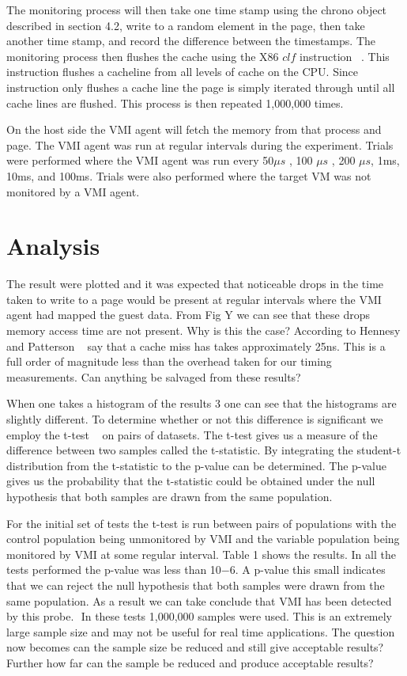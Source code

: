 The monitoring process will then take one time stamp using the chrono object described in section 4.2, write to a random element in the page, then take another time stamp, and record the difference between the timestamps. The monitoring process then flushes the cache using the X86 $clf$ instruction ~\cite{_intel_2014}. This instruction flushes a cacheline from all levels of cache on the CPU. Since instruction only flushes a cache line the page is simply iterated through until all cache lines are flushed. This process is then repeated 1,000,000 times. 

On the host side the VMI agent will fetch the memory from that process and page. The VMI agent was run at regular intervals during the experiment. Trials were performed where the VMI agent was run every 50$\mu s$ , 100 $\mu s$ , 200 $\mu s$, 1ms, 10ms, and 100ms. Trials were also performed where the target VM was not monitored by a VMI agent. 

\section{Analysis}

The result were plotted and it was expected that noticeable drops in the time taken to write to a page would be present at regular intervals where the VMI agent had mapped the guest data. From Fig Y we can see that these drops memory access time are not present. Why is this the case? According to Hennesy and Patterson ~\cite{hennessy_computer_2012} say that a cache miss has takes approximately 25ns. This is a full order of magnitude less than the overhead taken for our timing measurements. Can anything be salvaged from these results? 

When one takes a histogram of the results 3 one can see that the histograms are slightly different. To determine whether or not this difference is significant we employ the t-test ~\cite{welch_generalization_1947} on pairs of datasets. The t-test gives us a measure of the difference between two samples called the t-statistic. By integrating the student-t distribution from the t-statistic to the p-value can be determined. The p-value gives us the probability that the t-statistic could be obtained under the null hypothesis that both samples are drawn from the same population. 

For the initial set of tests the t-test is run between pairs of populations with the control population being unmonitored by VMI and the variable population being monitored by VMI at some regular interval. Table 1 shows the results. 
In all the tests performed the p-value was less than 10−6. A p-value this small indicates that we can reject the null hypothesis that both samples were drawn from the same population. As a result we can take conclude that VMI has been detected by this probe. 
In these tests 1,000,000 samples were used. This is an extremely large sample size and may not be useful for real time applications. The question now becomes can the sample size be reduced and still give acceptable results? Further how far can the sample be reduced and produce acceptable results? 

